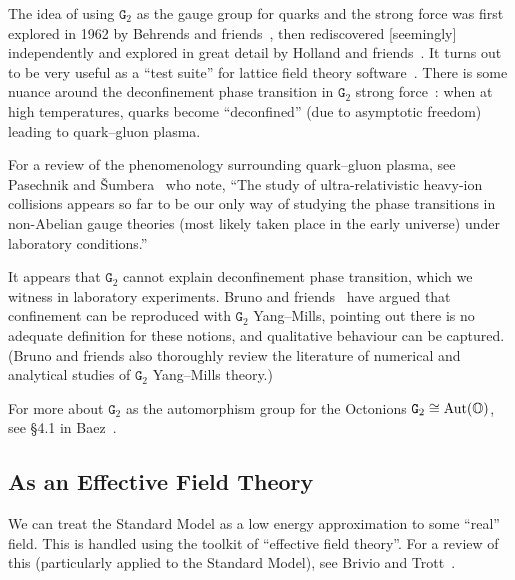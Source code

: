 The idea of using $\mathtt{G}_{2}$ as the gauge group for quarks and the
strong force was first explored in 1962 by Behrends and
friends~\cite{Behrends:1962zz}, then rediscovered [seemingly]
independently and explored in great detail by Holland and
friends~\cite{Holland:2003jy}. It turns out to be very useful as a
``test suite'' for lattice field theory
software~\cite{Ilgenfritz:2012wg,Maas:2012ts,Pepe:2006er,Wellegehausen:2011sc}.
There is some nuance around the deconfinement phase transition in
$\mathtt{G}_{2}$ strong force~\cite{Pepe:2005sz,Pepe:2006er}: when at
high temperatures, quarks become ``deconfined'' (due to asymptotic
freedom) leading to quark--gluon plasma.

For a review of the phenomenology surrounding quark--gluon plasma, see
Pasechnik and \v{S}umbera~\cite{Pasechnik:2016wkt} who note, ``The study
of ultra-relativistic heavy-ion collisions appears so far to be our only
way of studying the phase transitions in non-Abelian gauge theories
(most likely taken place in the early universe) under laboratory
conditions.''

It appears that $\mathtt{G}_{2}$ cannot explain deconfinement phase
transition, which we witness in laboratory experiments. Bruno and
friends~\cite{Bruno:2014rxa} have argued that confinement can be
reproduced with $\mathtt{G}_{2}$ Yang--Mills, pointing out there is no
adequate definition for these notions, and qualitative behaviour can be
captured. (Bruno and friends also thoroughly review the literature of
numerical and analytical studies of $\mathtt{G}_{2}$ Yang--Mills theory.)

\begin{remark}
For more about $\mathtt{G}_{2}$ as the automorphism group for the Octonions $\mathtt{G}_{2}\cong\operatorname{Aut}(\mathbb{O})$, see
\S4.1 in Baez~\cite{Baez:2001dm}.
\end{remark}

\subsection{As an Effective Field Theory}

\M
We can treat the Standard Model as a low energy approximation to some
``real'' field. This is handled using the toolkit of ``effective field
theory''.
For a review of this (particularly applied to the Standard Model), see
Brivio and Trott~\cite{Brivio:2017vri}.

